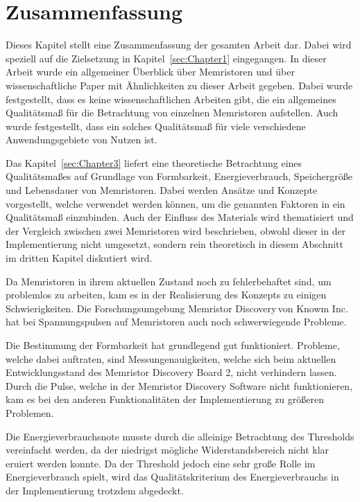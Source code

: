 

\chapter{Zusammenfassung}
\label{sec:Chapter6}
Dieses Kapitel stellt eine Zusammenfassung der gesamten Arbeit dar. Dabei wird speziell auf die Zielsetzung in Kapitel~\ref{sec:Chapter1} eingegangen. In dieser Arbeit wurde ein allgemeiner Überblick über Memristoren und über wissenschaftliche Paper mit Ähnlichkeiten zu dieser Arbeit gegeben. Dabei wurde festgestellt, dass es keine wissenschaftlichen Arbeiten gibt, die ein allgemeines Qualitätsmaß für die Betrachtung von einzelnen Memristoren aufstellen. Auch wurde festgestellt, dass ein solches Qualitätsmaß für viele verschiedene Anwendungsgebiete von Nutzen ist.

Das Kapitel~\ref{sec:Chapter3} liefert eine theoretische Betrachtung eines Qualitätsmaßes auf Grundlage von Formbarkeit, Energieverbrauch, Speichergröße und Lebensdauer von Memristoren. Dabei werden Ansätze und Konzepte vorgestellt, welche verwendet werden können, um die genannten Faktoren in ein Qualitätsmaß einzubinden. Auch der Einfluss des Materials wird thematisiert und der Vergleich zwischen zwei Memristoren wird beschrieben, obwohl dieser in der Implementierung nicht umgesetzt, sondern rein theoretisch in diesem Abschnitt im dritten Kapitel diskutiert wird.

Da Memristoren in ihrem aktuellen Zustand noch zu fehlerbehaftet sind, um problemlos zu arbeiten, kam es in der Realisierung des Konzepts zu einigen Schwierigkeiten. Die Forschungsumgebung \glqq Memristor Discovery\grqq\,von Knowm Inc. hat bei Spannungspulsen auf Memristoren auch noch schwerwiegende Probleme.

Die Bestimmung der Formbarkeit hat grundlegend gut funktioniert. Probleme, welche dabei auftraten, sind Messungenauigkeiten, welche sich beim aktuellen Entwicklungsstand des Memristor Discovery Board 2, nicht verhindern lassen. Durch die Pulse, welche in der Memristor Discovery Software nicht funktionieren, kam es bei den anderen Funktionalitäten der Implementierung zu größeren Problemen.

Die Energieverbrauchsnote musste durch die alleinige Betrachtung des Thresholds vereinfacht werden, da der niedrigst mögliche Widerstandsbereich nicht klar eruiert werden konnte. Da der Threshold jedoch eine sehr große Rolle im Energieverbrauch spielt, wird das Qualitätskriterium des Energieverbrauchs in der Implementierung trotzdem abgedeckt.


